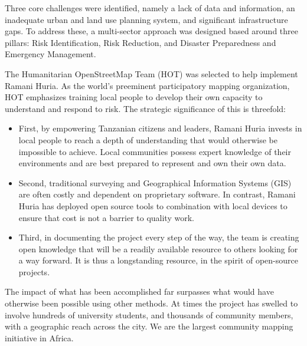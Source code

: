 \documentclass[a4paper,12pt,twoside]{article}
\begin{document}
Three core challenges were identified, namely a lack of data and information, an inadequate urban and land use planning system, and significant infrastructure gaps. To address these, a multi-sector approach was designed based around three pillars: Risk Identification, Risk Reduction, and Disaster Preparedness and Emergency Management. 

The Humanitarian OpenStreetMap Team (HOT) was selected  to help implement  Ramani Huria. As the world's preeminent participatory mapping organization, HOT emphasizes training local people  to develop their own capacity to understand and respond to risk. The strategic significance of this is threefold: 

\begin{itemize}
    \item First, by empowering Tanzanian citizens and leaders, Ramani Huria invests in local people to reach a depth of understanding that would otherwise be impossible to achieve. Local communities possess expert knowledge of their environments and are best prepared to represent and own their own data. 
    \item Second, traditional surveying and Geographical Information Systems (GIS) are often costly and dependent on proprietary software. In contrast, Ramani Huria has deployed open source tools to combination with local devices to ensure that cost is not a barrier to quality work.  
    \item Third, in documenting the project every step of the way, the team is creating open knowledge that will be a readily available resource to others looking for a way forward. It is thus a longstanding resource, in the spirit of open-source projects. 
\end{itemize}

The impact of what has been accomplished far surpasses what would have otherwise been possible using other methods. At times the project has swelled to involve hundreds of university students, and thousands of community members, with a geographic reach across the city. We are  the largest community mapping initiative in Africa.
 

\newpage
\end{document}
